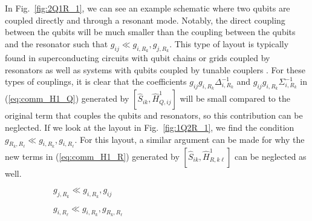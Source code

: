 In Fig.\ \ref{fig:2Q1R_1}, we can see an example schematic where two qubits are coupled directly and through a resonant mode. Notably, the direct coupling between the qubits will be much smaller than the coupling between the qubits and the resonator such that $g_{ij} \ll g_{i,R_k}, g_{j,R_k}$. This type of layout is typically found in superconducting circuits with qubit chains or grids coupled by resonators \cite{solgun_sirf,rapid_multiplexed_readout} as well as systems with qubits coupled by tunable couplers \cite{tunable_coupler,high_fidelity_cz_iswap_tc,long_distance_coupler}. For these types of couplings, it is clear that the coefficients $g_{ij}g_{i,R_k}\Delta_{i,R_k}^{-1}$ and $g_{ij}g_{i,R_k}\Sigma_{i,R_k}^{-1}$ in (\ref{eq:comm_H1_Q}) generated by $[\hat{S}_{ik}, \hat{H}^1_{Q,ij}]$  will be small compared to the original term that couples the qubits and resonators, so this contribution can be neglected. If we look at the layout in Fig.\ \ref{fig:1Q2R_1}, we find the condition $g_{R_k,R_\ell} \ll g_{i,R_k},g_{i,R_\ell}$. For this layout, a similar argument can be made for why the new terms in (\ref{eq:comm_H1_R}) generated by $[\hat{S}_{ik}, \hat{H}^1_{R,k\ell}]$ can be neglected as well.

\begin{figure}[h!]
    \centering
    \begin{subfigure}{.4\textwidth}
        \centering
        \caption{$g_{j,R_k} \ll g_{i,R_k},g_{ij}$}
        \label{fig:2Q1R_2}
    \end{subfigure}%
    \begin{subfigure}{.4\textwidth}
        \centering
        \caption{$g_{i,R_\ell} \ll g_{i,R_k},g_{R_k,R_\ell}$}
        \label{fig:1Q2R_2}
    \end{subfigure}
    \caption{}
    \label{fig:angle_layout}
\end{figure}

